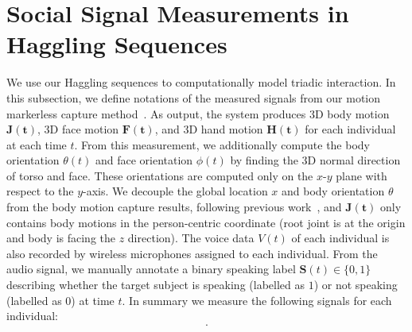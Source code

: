 
\section{Social Signal Measurements in Haggling Sequences}

We use our Haggling sequences to computationally model triadic interaction.  In this subsection, we define notations of the measured signals from our motion markerless capture method~\cite{joo2017panoptic, joo2018}. As output, the system produces 3D body motion $\mathbf{J(t)}$, 3D face motion $\mathbf{F(t)}$, and 3D hand motion $\mathbf{H(t)}$ for each individual at each time $t$. From this measurement, we additionally compute the body orientation $\theta(t)$ and face orientation $\phi(t)$ by finding the 3D normal direction of torso and face. These orientations are computed only on the $x$-$y$ plane with respect to the $y$-axis. We decouple the global location $x$ and body orientation $\theta$ from the body motion capture results, following previous work~\cite{jain2016structural, holden2016deep}, and $\mathbf{J(t)}$ only contains body motions in the person-centric coordinate (root joint is at the origin and body is facing the $z$ direction). The voice data $V(t)$ of each individual is also recorded by wireless microphones assigned to each individual. From the audio signal, we manually annotate a binary speaking label $\mathbf{S}(t) \in \{0,1\}$ describing whether the target subject is speaking (labelled as $1$) or not speaking (labelled as $0$) at time $t$. In summary we measure the following signals for each individual:
\begin{equation}
[ \mathbf{x}, \boldsymbol{\theta}, \boldsymbol{\phi}, \mathbf{J}, \mathbf{F}, \mathbf{H}, \mathbf{V}, \mathbf{S} ].
\label{equation:measurement}
\end{equation}



